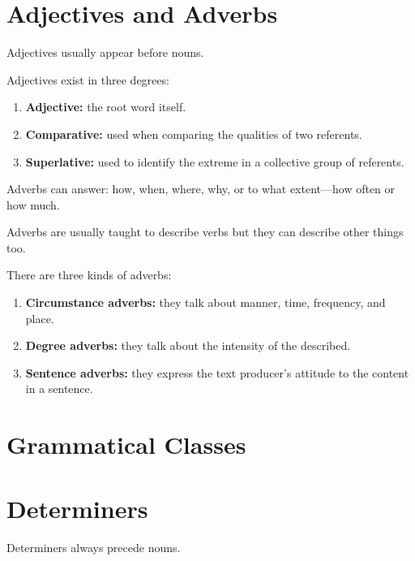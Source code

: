 \documentclass[../main.tex]{subfiles}
\begin{document}
	\section{Adjectives and Adverbs}
	Adjectives usually appear before nouns.
	
	Adjectives exist in three degrees:
	\begin{enumerate}
		\item \textbf{Adjective:} the root word itself.
		\item \textbf{Comparative:} used when comparing the qualities of two referents.
		\item \textbf{Superlative:} used to identify the extreme in a collective group of referents.
	\end{enumerate}
	
	Adverbs can answer: how, when, where, why, or to what extent---how often or how much.
	
	Adverbs are usually taught to describe verbs but they can describe other things too.
	
	There are three kinds of adverbs:
	\begin{enumerate}
		\item \textbf{Circumstance adverbs:} they talk about manner, time, frequency, and place.
		\item \textbf{Degree adverbs:} they talk about the intensity of the described.
		\item \textbf{Sentence adverbs:} they express the text producer's attitude to the content in a sentence.
	\end{enumerate}
	
	\section*{Grammatical Classes}
	\section{Determiners}
	Determiners always precede nouns.
\end{document}
